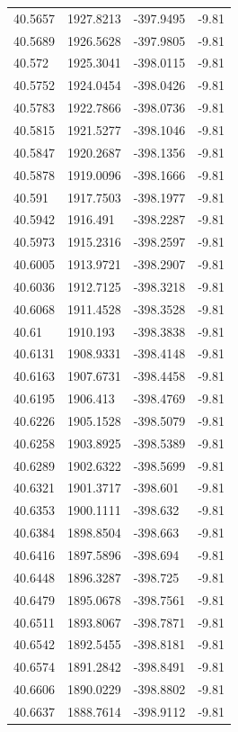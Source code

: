 \begin{table}[H]
\begin{tabular}{llll}
40.5657 & 1927.8213 & -397.9495 & -9.81 \\
40.5689 & 1926.5628 & -397.9805 & -9.81 \\
40.572 & 1925.3041 & -398.0115 & -9.81 \\
40.5752 & 1924.0454 & -398.0426 & -9.81 \\
40.5783 & 1922.7866 & -398.0736 & -9.81 \\
40.5815 & 1921.5277 & -398.1046 & -9.81 \\
40.5847 & 1920.2687 & -398.1356 & -9.81 \\
40.5878 & 1919.0096 & -398.1666 & -9.81 \\
40.591 & 1917.7503 & -398.1977 & -9.81 \\
40.5942 & 1916.491 & -398.2287 & -9.81 \\
40.5973 & 1915.2316 & -398.2597 & -9.81 \\
40.6005 & 1913.9721 & -398.2907 & -9.81 \\
40.6036 & 1912.7125 & -398.3218 & -9.81 \\
40.6068 & 1911.4528 & -398.3528 & -9.81 \\
40.61 & 1910.193 & -398.3838 & -9.81 \\
40.6131 & 1908.9331 & -398.4148 & -9.81 \\
40.6163 & 1907.6731 & -398.4458 & -9.81 \\
40.6195 & 1906.413 & -398.4769 & -9.81 \\
40.6226 & 1905.1528 & -398.5079 & -9.81 \\
40.6258 & 1903.8925 & -398.5389 & -9.81 \\
40.6289 & 1902.6322 & -398.5699 & -9.81 \\
40.6321 & 1901.3717 & -398.601 & -9.81 \\
40.6353 & 1900.1111 & -398.632 & -9.81 \\
40.6384 & 1898.8504 & -398.663 & -9.81 \\
40.6416 & 1897.5896 & -398.694 & -9.81 \\
40.6448 & 1896.3287 & -398.725 & -9.81 \\
40.6479 & 1895.0678 & -398.7561 & -9.81 \\
40.6511 & 1893.8067 & -398.7871 & -9.81 \\
40.6542 & 1892.5455 & -398.8181 & -9.81 \\
40.6574 & 1891.2842 & -398.8491 & -9.81 \\
40.6606 & 1890.0229 & -398.8802 & -9.81 \\
40.6637 & 1888.7614 & -398.9112 & -9.81 \\

\end{tabular}
\end{table}
